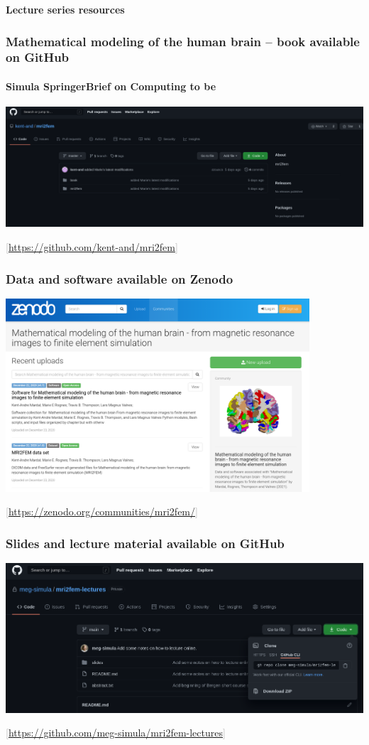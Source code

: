 \documentclass[mathserif, aspectratio=169]{beamer}
\newcommand{\refer}[1]{\begin{flushright}{\tiny \textcolor{darkgray}{[#1]}}\end{flushright}}
\newcommand{\mysection}[1]{\begin{frame} \begin{center} \vspace{3em} \textbf{#1} \end{center} \end{frame}}
\begin{document}
\mysection{Lecture series resources}

\begin{frame}
  \frametitle{Mathematical modeling of the human brain -- book available on GitHub}
  \framesubtitle{Simula SpringerBrief on Computing to be}
  \centering
  \includegraphics[width=\textwidth]{graphics/mri2fem-book-github.png} \\
  \refer{\href{https://github.com/kent-and/mri2fem}{https://github.com/kent-and/mri2fem}}
\end{frame}


\begin{frame}
  \frametitle{Data and software available on Zenodo}
  \vspace{-0.5em}
  \centering
  \includegraphics[width=0.85\textwidth]{graphics/mri2fem-zenodo.png} \\
  \vspace{-1em}
  \refer{\href{https://zenodo.org/communities/mri2fem/}{https://zenodo.org/communities/mri2fem/}}
\end{frame}


\begin{frame}
  \frametitle{Slides and lecture material available on GitHub}
  \centering
  \includegraphics[width=\textwidth]{graphics/mri2fem-lectures-github.png} \\
  \refer{\href{https://github.com/meg-simula/mri2fem-lectures}{https://github.com/meg-simula/mri2fem-lectures}}
\end{frame}
\end{document}
